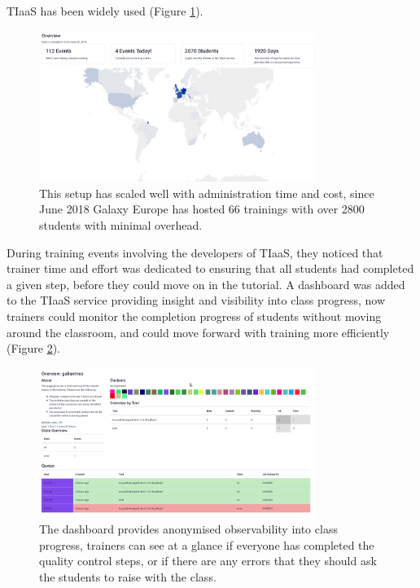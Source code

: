 \documentclass[10pt,letterpaper]{article}
\begin{document}
TIaaS has been widely used (Figure \ref{fig:tiaas-map}).

\begin{figure}[!ht]
	\centering
	\includegraphics[width=0.8\textwidth]{images/tiaas-map.png}
	\caption{This setup has scaled well with administration time and cost, since June 2018 Galaxy Europe has hosted 66 trainings with over 2800 students with minimal overhead.\label{fig:tiaas-map}}
\end{figure}


During training events involving the developers of TIaaS, they noticed that trainer time and effort was dedicated to ensuring that all students had completed a given step, before they could move on in the tutorial.
A dashboard was added to the TIaaS service providing insight and visibility into class progress, now trainers could monitor the completion progress of students without moving around the classroom, and could move forward with training more efficiently (Figure \ref{fig:tiaas}).


\begin{figure}[!ht]
	\centering
	\includegraphics[width=0.8\textwidth]{images/tiaas.png}
	\caption{The dashboard provides anonymised observability into class progress, trainers can see at a glance if everyone has completed the quality control steps, or if there are any errors that they should ask the students to raise with the class.\label{fig:tiaas}}
\end{figure}
\end{document}
